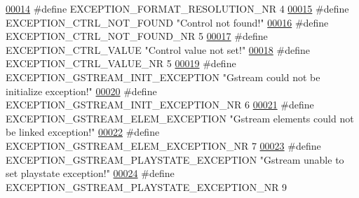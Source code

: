 \begin{DoxyCode}
\hypertarget{_microscope_not_found_exception_8h_source_l00014}{}\hyperlink{_microscope_not_found_exception_8h_a7e0d3f44d25567abb551e6c33bfeb1f2}{00014} \textcolor{preprocessor}{#define EXCEPTION\_FORMAT\_RESOLUTION\_NR 4}
\hypertarget{_microscope_not_found_exception_8h_source_l00015}{}\hyperlink{_microscope_not_found_exception_8h_ab2f26cdb6306df3f23ca653407f10cdf}{00015} \textcolor{preprocessor}{#define EXCEPTION\_CTRL\_NOT\_FOUND "Control not found!"}
\hypertarget{_microscope_not_found_exception_8h_source_l00016}{}\hyperlink{_microscope_not_found_exception_8h_a394040cb4491689f2ad71244f548d8c3}{00016} \textcolor{preprocessor}{#define EXCEPTION\_CTRL\_NOT\_FOUND\_NR 5}
\hypertarget{_microscope_not_found_exception_8h_source_l00017}{}\hyperlink{_microscope_not_found_exception_8h_a8cca24aa237c63f4d9468d5e8f0c0a2d}{00017} \textcolor{preprocessor}{#define EXCEPTION\_CTRL\_VALUE "Control value not set!"}
\hypertarget{_microscope_not_found_exception_8h_source_l00018}{}\hyperlink{_microscope_not_found_exception_8h_ae7c60c82c89e936c7fc3fe6c53749cfc}{00018} \textcolor{preprocessor}{#define EXCEPTION\_CTRL\_VALUE\_NR 5}
\hypertarget{_microscope_not_found_exception_8h_source_l00019}{}\hyperlink{_microscope_not_found_exception_8h_aeb9339c022da53faf12599857f661962}{00019} \textcolor{preprocessor}{#define EXCEPTION\_GSTREAM\_INIT\_EXCEPTION "Gstream could not be initialize exception!"}
\hypertarget{_microscope_not_found_exception_8h_source_l00020}{}\hyperlink{_microscope_not_found_exception_8h_acb49fd823d771758e1512edbae75c5c8}{00020} \textcolor{preprocessor}{#define EXCEPTION\_GSTREAM\_INIT\_EXCEPTION\_NR 6}
\hypertarget{_microscope_not_found_exception_8h_source_l00021}{}\hyperlink{_microscope_not_found_exception_8h_a3b16a54d331309167dfedbf852b88c11}{00021} \textcolor{preprocessor}{#define EXCEPTION\_GSTREAM\_ELEM\_EXCEPTION "Gstream elements could not be linked exception!"}
\hypertarget{_microscope_not_found_exception_8h_source_l00022}{}\hyperlink{_microscope_not_found_exception_8h_a1bc7e12fa98808c93e5ae73f44eaae6d}{00022} \textcolor{preprocessor}{#define EXCEPTION\_GSTREAM\_ELEM\_EXCEPTION\_NR 7}
\hypertarget{_microscope_not_found_exception_8h_source_l00023}{}\hyperlink{_microscope_not_found_exception_8h_ac9910e42d87ae3582b883e6a019fc146}{00023} \textcolor{preprocessor}{#define EXCEPTION\_GSTREAM\_PLAYSTATE\_EXCEPTION "Gstream unable to set playstate exception!"}
\hypertarget{_microscope_not_found_exception_8h_source_l00024}{}\hyperlink{_microscope_not_found_exception_8h_a08bf758a63bce4b9c028e1854a00e47f}{00024} \textcolor{preprocessor}{#define EXCEPTION\_GSTREAM\_PLAYSTATE\_EXCEPTION\_NR 9}

\end{DoxyCode}
